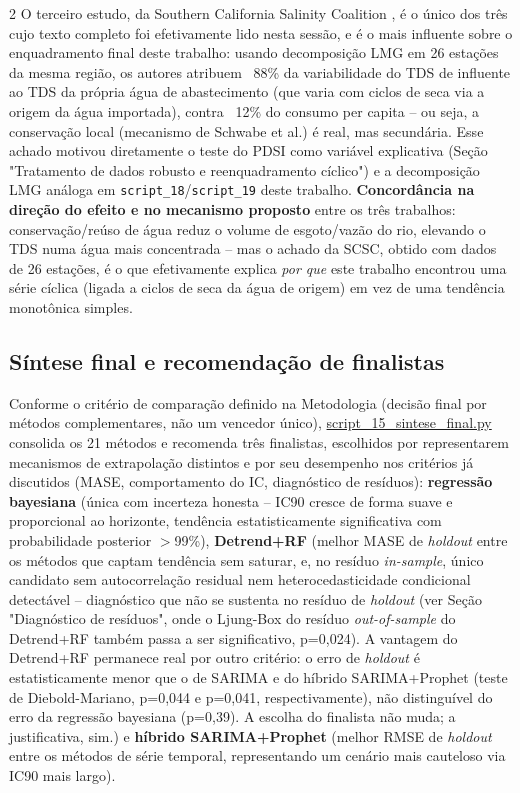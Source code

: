 \begin{multicols*}{2}
O terceiro estudo, da Southern California Salinity Coalition \cite{scsc2018tds}, é o único dos três cujo texto completo foi efetivamente lido nesta sessão, e é o mais influente sobre o enquadramento final deste trabalho: usando decomposição LMG em 26 estações da mesma região, os autores atribuem ~88\% da variabilidade do TDS de influente ao TDS da própria água de abastecimento (que varia com ciclos de seca via a origem da água importada), contra ~12\% do consumo per capita -- ou seja, a conservação local (mecanismo de Schwabe et al.) é real, mas secundária. Esse achado motivou diretamente o teste do PDSI como variável explicativa (Seção "Tratamento de dados robusto e reenquadramento cíclico") e a decomposição LMG análoga em \texttt{script\_18}/\texttt{script\_19} deste trabalho. \textbf{Concordância na direção do efeito e no mecanismo proposto} entre os três trabalhos: conservação/reúso de água reduz o volume de esgoto/vazão do rio, elevando o TDS numa água mais concentrada -- mas o achado da SCSC, obtido com dados de 26 estações, é o que efetivamente explica \emph{por que} este trabalho encontrou uma série cíclica (ligada a ciclos de seca da água de origem) em vez de uma tendência monotônica simples.

\subsection{Síntese final e recomendação de finalistas}

Conforme o critério de comparação definido na Metodologia (decisão final por métodos complementares, não um vencedor único), \url{script_15_sintese_final.py} consolida os 21 métodos e recomenda três finalistas, escolhidos por representarem mecanismos de extrapolação distintos e por seu desempenho nos critérios já discutidos (MASE, comportamento do IC, diagnóstico de resíduos): \textbf{regressão bayesiana} (única com incerteza honesta -- IC90 cresce de forma suave e proporcional ao horizonte, tendência estatisticamente significativa com probabilidade posterior $>$99\%), \textbf{Detrend+RF} (melhor MASE de \textit{holdout} entre os métodos que captam tendência sem saturar, e, no resíduo \textit{in-sample}, único candidato sem autocorrelação residual nem heterocedasticidade condicional detectável -- diagnóstico que não se sustenta no resíduo de \textit{holdout} (ver Seção "Diagnóstico de resíduos", onde o Ljung-Box do resíduo \textit{out-of-sample} do Detrend+RF também passa a ser significativo, p=0,024). A vantagem do Detrend+RF permanece real por outro critério: o erro de \textit{holdout} é estatisticamente menor que o de SARIMA e do híbrido SARIMA+Prophet (teste de Diebold-Mariano, p=0,044 e p=0,041, respectivamente), não distinguível do erro da regressão bayesiana (p=0,39). A escolha do finalista não muda; a justificativa, sim.) e \textbf{híbrido SARIMA+Prophet} (melhor RMSE de \textit{holdout} entre os métodos de série temporal, representando um cenário mais cauteloso via IC90 mais largo).


\end{multicols*}
